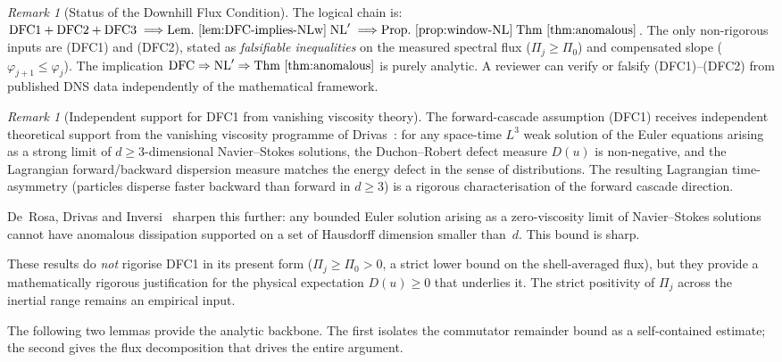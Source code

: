 \documentclass[12pt,a4paper]{article}
\theoremstyle{definition}
\theoremstyle{plain}
\theoremstyle{remark}
\newtheorem{remark}[definition]{Remark}
\begin{document}
\begin{remark}[Status of the Downhill Flux Condition]
\medskip\noindent
The logical chain is:
$\textup{DFC1} + \textup{DFC2} + \textup{DFC3}
\;\Longrightarrow{\text{Lem.~\ref{lem:DFC-implies-NLw}}}\;
\textup{NL}'
\;\Longrightarrow{\text{Prop.~\ref{prop:window-NL}}}\;
\textup{Thm~\ref{thm:anomalous}}$.
The only non-rigorous inputs are (DFC1) and (DFC2), stated as
\emph{falsifiable inequalities} on the measured spectral flux
($\Pi_j \ge \Pi_0$) and compensated slope ($\varphi_{j+1} \le
\varphi_j$). The implication $\textup{DFC} \Rightarrow \textup{NL}'
\Rightarrow \textup{Thm~\ref{thm:anomalous}}$ is purely analytic.
A reviewer can verify or falsify (DFC1)--(DFC2) from published DNS
data independently of the mathematical framework.
\end{remark}

\begin{remark}[Independent support for DFC1 from vanishing viscosity theory]
\label{rem:Drivas-VV}
The forward-cascade assumption (DFC1) receives independent theoretical
support from the vanishing viscosity programme of
Drivas~\cite{Drivas2019cascade}:
for any space-time $L^3$ weak solution of the Euler equations arising as a
strong limit of $d\ge 3$-dimensional Navier--Stokes solutions, the
Duchon--Robert defect measure $D(u)$ is non-negative, and the Lagrangian
forward/backward dispersion measure matches the energy defect in the sense
of distributions. The resulting Lagrangian time-asymmetry (particles
disperse faster backward than forward in $d\ge 3$) is a rigorous
characterisation of the forward cascade direction.

De~Rosa, Drivas and Inversi~\cite{DeRosaDrivasInversi2024} sharpen this
further: any bounded Euler solution arising as a zero-viscosity limit of
Navier--Stokes solutions cannot have anomalous dissipation supported on a
set of Hausdorff dimension smaller than~$d$. This bound is sharp.

These results do \emph{not} rigorise DFC1 in its present form
($\Pi_j \ge \Pi_0 > 0$, a strict lower bound on the shell-averaged flux),
but they provide a mathematically rigorous justification for the physical
expectation $D(u) \ge 0$ that underlies it. The strict positivity of
$\Pi_j$ across the inertial range remains an empirical input.
\end{remark}

The following two lemmas provide the analytic backbone. The first
isolates the commutator remainder bound as a self-contained estimate;
the second gives the flux decomposition that drives the entire argument.
\end{document}
